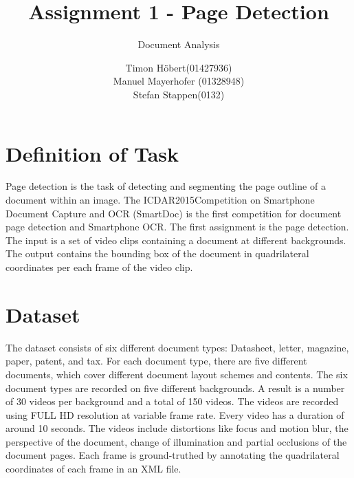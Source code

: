 \documentclass[english, paper=a4]{scrartcl}
\begin{document}
\graphicspath{{images/}}


\title{Assignment 1 - Page Detection} 

\subtitle{Document Analysis} 

\author{Timon Höbert(01427936) \\ Manuel Mayerhofer (01328948)\\ Stefan Stappen(0132)}




\maketitle



\section{Definition of Task}
Page detection is the task of detecting and segmenting the page outline of a document within an image. The ICDAR2015Competition on Smartphone Document Capture and OCR (SmartDoc) \cite{burie2015icdar2015} is the first competition for document page detection and Smartphone OCR. The first assignment is the page detection.\\
The input is a set of video clips containing a document at different backgrounds. The output contains the bounding box of the document in quadrilateral coordinates per each frame of the video clip.

\section{Dataset}
The dataset consists of six different document types: Datasheet, letter, magazine, paper, patent, and tax.
For each document type, there are five different documents, which cover different document layout schemes and contents.
The six document types are recorded on five different backgrounds. A result is a number of 30 videos per background and a total of 150 videos. The videos are recorded using FULL HD resolution at variable frame rate.  
Every video has a duration of around 10 seconds. The videos include distortions like focus and motion blur, the perspective of the document, change of illumination and partial occlusions of the document pages. Each frame is ground-truthed by annotating the quadrilateral coordinates of each frame in an XML file.
\end{document}
